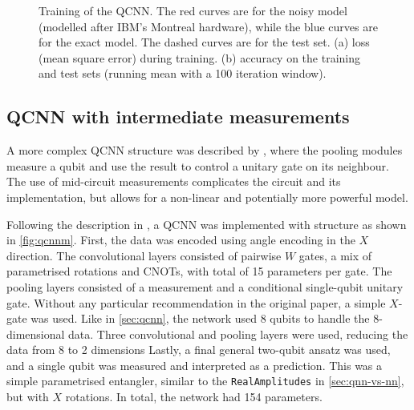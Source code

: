 \begin{figure}
\begin{subfigure}{0.49\textwidth}
        \caption{}
        \label{fig:qcnn_acc}
    \end{subfigure}
    \caption{
        Training of the QCNN.
        The red curves are for the noisy model (modelled after IBM's Montreal hardware), while the blue curves are for the exact model.
        The dashed curves are for the test set.
        (a) loss (mean square error) during training.
        (b) accuracy on the training and test sets (running mean with a 100 iteration window).
    }
    \label{fig:qcnn_training}
\end{figure}


\subsection{QCNN with intermediate measurements}
A more complex QCNN structure was described by \textcite{pesah2021}, where the pooling modules measure a qubit and use the result to control a unitary gate on its neighbour.
The use of mid-circuit measurements complicates the circuit and its implementation, but allows for a non-linear and potentially more powerful model.

Following the description in \cite{pesah2021}, a QCNN was implemented with structure as shown in \cref{fig:qcnnm}.
First, the data was encoded using angle encoding in the $X$ direction.
The convolutional layers consisted of pairwise $W$ gates, a mix of parametrised rotations and CNOTs, with total of 15 parameters per gate.
The pooling layers consisted of a measurement and a conditional single-qubit unitary gate.
Without any particular recommendation in the original paper, a simple $X$-gate was used.
Like in \cref{sec:qcnn}, the network used 8 qubits to handle the 8-dimensional data.
Three convolutional and pooling layers were used, reducing the data from 8 to 2 dimensions
Lastly, a final general two-qubit ansatz was used, and a single qubit was measured and interpreted as a prediction.
This was a simple parametrised entangler, similar to the \texttt{RealAmplitudes} in \cref{sec:qnn-vs-nn}, but with $X$ rotations.
In total, the network had 154 parameters.

